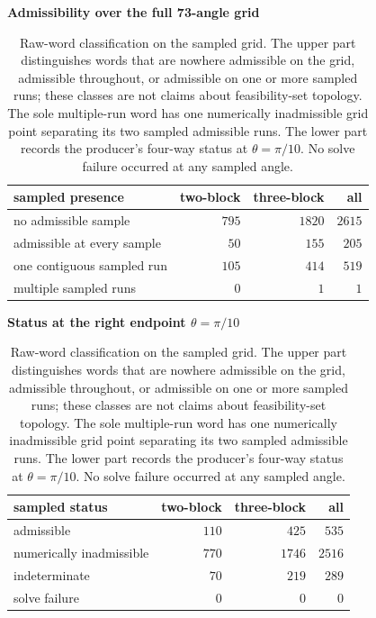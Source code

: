 \begin{table}[p]
\centering
\small
\textbf{Admissibility over the full 73-angle grid}\par\smallskip
\begin{tabular}{@{}lrrr@{}}
\toprule
sampled presence & two-block & three-block & all\\
\midrule
no admissible sample & \(795\) & \(1820\) & \(2615\)\\
admissible at every sample & \(50\) & \(155\) & \(205\)\\
one contiguous sampled run & \(105\) & \(414\) & \(519\)\\
multiple sampled runs & \(0\) & \(1\) & \(1\)\\
\bottomrule
\end{tabular}

\vspace{1.5em}
\textbf{Status at the right endpoint \(\theta=\pi/10\)}\par\smallskip
\begin{tabular}{@{}lrrr@{}}
\toprule
sampled status & two-block & three-block & all\\
\midrule
admissible & \(110\) & \(425\) & \(535\)\\
numerically inadmissible & \(770\) & \(1746\) & \(2516\)\\
indeterminate & \(70\) & \(219\) & \(289\)\\
solve failure & \(0\) & \(0\) & \(0\)\\
\bottomrule
\end{tabular}
\caption{Raw-word classification on the sampled grid.  The upper part
distinguishes words that are nowhere admissible on the grid, admissible
throughout, or admissible on one or more sampled runs; these classes are not
claims about feasibility-set topology.  The sole multiple-run word has
one numerically inadmissible grid point separating its two sampled admissible
runs.  The lower part records the producer's four-way status at
\(\theta=\pi/10\).  No solve failure occurred at any sampled angle.}
\label{tab:rotated-pentagon-sampled-presence}
\end{table}
\FloatBarrier
